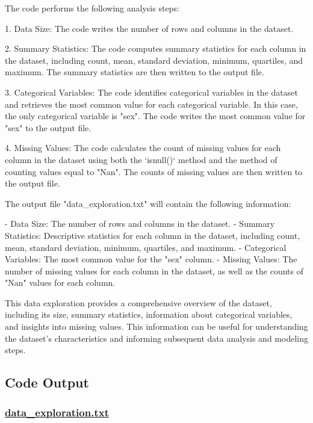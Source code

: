 \documentclass[11pt]{article}
\begin{document}
The code performs the following analysis steps:

1. Data Size: The code writes the number of rows and columns in the dataset.

2. Summary Statistics: The code computes summary statistics for each column in the dataset, including count, mean, standard deviation, minimum, quartiles, and maximum. The summary statistics are then written to the output file.

3. Categorical Variables: The code identifies categorical variables in the dataset and retrieves the most common value for each categorical variable. In this case, the only categorical variable is "sex". The code writes the most common value for "sex" to the output file.

4. Missing Values: The code calculates the count of missing values for each column in the dataset using both the `isnull()` method and the method of counting values equal to "Nan". The counts of missing values are then written to the output file.

The output file "data\_exploration.txt" will contain the following information:

- Data Size: The number of rows and columns in the dataset.
- Summary Statistics: Descriptive statistics for each column in the dataset, including count, mean, standard deviation, minimum, quartiles, and maximum.
- Categorical Variables: The most common value for the "sex" column.
- Missing Values: The number of missing values for each column in the dataset, as well as the counts of "Nan" values for each column.

This data exploration provides a comprehensive overview of the dataset, including its size, summary statistics, information about categorical variables, and insights into missing values. This information can be useful for understanding the dataset's characteristics and informing subsequent data analysis and modeling steps.

\subsection{Code Output}\hypertarget{file-data-exploration-txt}{}

\subsubsection*{\hyperlink{code-Data Exploration-data-exploration-txt}{data\_exploration.txt}}
\end{document}
